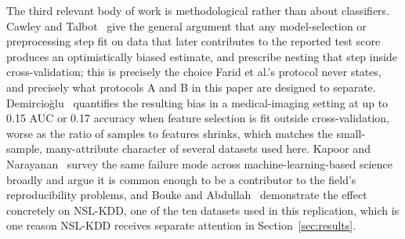 The third relevant body of work is methodological rather than about
classifiers. Cawley and Talbot~\cite{cawley2010overfitting} give the
general argument that any model-selection or preprocessing step fit on
data that later contributes to the reported test score produces an
optimistically biased estimate, and prescribe nesting that step inside
cross-validation; this is precisely the choice Farid et al.'s protocol
never states, and precisely what protocols A and B in this paper are
designed to separate. Demircio\u{g}lu~\cite{demircioglu2021measuring}
quantifies the resulting bias in a medical-imaging setting at up to 0.15
AUC or 0.17 accuracy when feature selection is fit outside
cross-validation, worse as the ratio of samples to features shrinks, which
matches the small-sample, many-attribute character of several datasets
used here. Kapoor and Narayanan~\cite{kapoor2023leakage} survey the same
failure mode across machine-learning-based science broadly and argue it
is common enough to be a contributor to the field's reproducibility
problems, and Bouke and Abdullah~\cite{bouke2023empirical} demonstrate the
effect concretely on NSL-KDD, one of the ten datasets used in this
replication, which is one reason NSL-KDD receives separate attention in
Section~\ref{sec:results}.
